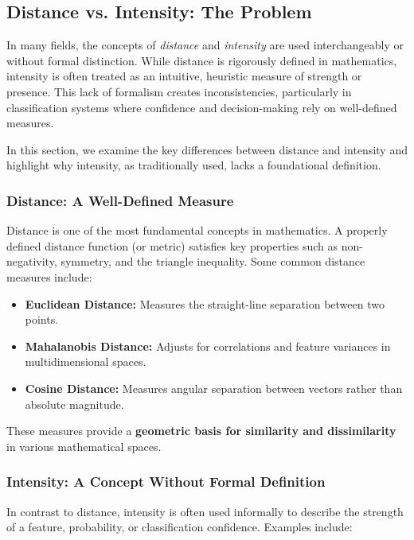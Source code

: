 \subsection{Distance vs. Intensity: The Problem}

In many fields, the concepts of \textit{distance} and \textit{intensity} are used interchangeably or without formal distinction. While distance is rigorously defined in mathematics, intensity is often treated as an intuitive, heuristic measure of strength or presence. This lack of formalism creates inconsistencies, particularly in classification systems where confidence and decision-making rely on well-defined measures.

In this section, we examine the key differences between distance and intensity and highlight why intensity, as traditionally used, lacks a foundational definition.

\subsubsection{Distance: A Well-Defined Measure}

Distance is one of the most fundamental concepts in mathematics. A properly defined distance function (or metric) satisfies key properties such as non-negativity, symmetry, and the triangle inequality. Some common distance measures include:

\begin{itemize}
    \item \textbf{Euclidean Distance:} Measures the straight-line separation between two points.
    \item \textbf{Mahalanobis Distance:} Adjusts for correlations and feature variances in multidimensional spaces.
    \item \textbf{Cosine Distance:} Measures angular separation between vectors rather than absolute magnitude.
\end{itemize}

These measures provide a \textbf{geometric basis for similarity and dissimilarity} in various mathematical spaces.

\subsubsection{Intensity: A Concept Without Formal Definition}

In contrast to distance, intensity is often used informally to describe the strength of a feature, probability, or classification confidence. Examples include:

